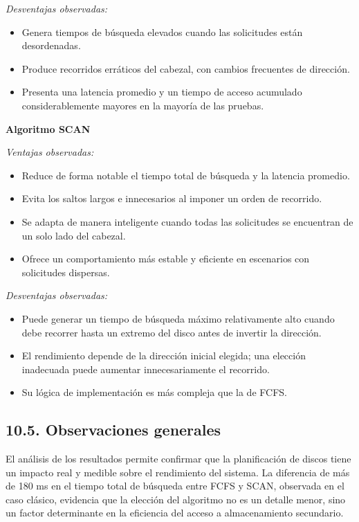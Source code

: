 \documentclass[14pt,letterpaper]{extarticle}
\begin{document}
\textit{Desventajas observadas:}
\begin{itemize}
    \item Genera tiempos de búsqueda elevados cuando las solicitudes están desordenadas.
    \item Produce recorridos erráticos del cabezal, con cambios frecuentes de dirección.
    \item Presenta una latencia promedio y un tiempo de acceso acumulado considerablemente mayores en la mayoría de las pruebas.
\end{itemize}

\textbf{Algoritmo SCAN}

\textit{Ventajas observadas:}
\begin{itemize}
    \item Reduce de forma notable el tiempo total de búsqueda y la latencia promedio.
    \item Evita los saltos largos e innecesarios al imponer un orden de recorrido.
    \item Se adapta de manera inteligente cuando todas las solicitudes se encuentran de un solo lado del cabezal.
    \item Ofrece un comportamiento más estable y eficiente en escenarios con solicitudes dispersas.
\end{itemize}

\textit{Desventajas observadas:}
\begin{itemize}
    \item Puede generar un tiempo de búsqueda máximo relativamente alto cuando debe recorrer hasta un extremo del disco antes de invertir la dirección.
    \item El rendimiento depende de la dirección inicial elegida; una elección inadecuada puede aumentar innecesariamente el recorrido.
    \item Su lógica de implementación es más compleja que la de FCFS.
\end{itemize}

\subsection*{10.5. Observaciones generales}

El análisis de los resultados permite confirmar que la planificación de discos tiene un impacto real y medible sobre el rendimiento del sistema. La diferencia de más de 180 ms en el tiempo total de búsqueda entre FCFS y SCAN, observada en el caso clásico, evidencia que la elección del algoritmo no es un detalle menor, sino un factor determinante en la eficiencia del acceso a almacenamiento secundario.
\end{document}
